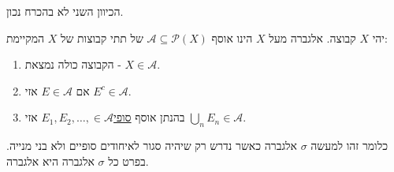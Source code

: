 \documentclass{tstextbook}
\begin{document}
\begin{remark}
הכיוון השני לא בהכרח נכון.

\end{remark}
\begin{reminder}[אלגברה]
יהי \(X\) קבוצה. אלגברה מעל \(X\) הינו אוסף \(\mathcal{A}\subseteq \mathcal{P}(X)\) של תתי קבוצות של \(X\) המקיימת:

  \begin{enumerate}
    \item הקבוצה כולה נמצאת - \(X \in \mathcal{A}\). 


    \item אם \(E \in \mathcal{A}\) אזי \(E^{c} \in \mathcal{A}\). 


    \item בהנתן אוסף \underline{סופי}\(E_{1}, E_{2},\dots, \in \mathcal{A}\) אזי \(\bigcup_{n}E_{n}\in \mathcal{A}\). 


  \end{enumerate}
\end{reminder}
כלומר זהו למעשה \(\sigma\) אלגברה כאשר נדרש רק שיהיה סגור לאיחודים סופיים ולא בני מנייה. בפרט כל \(\sigma\) אלגברה היא אלגברה.
\end{document}
